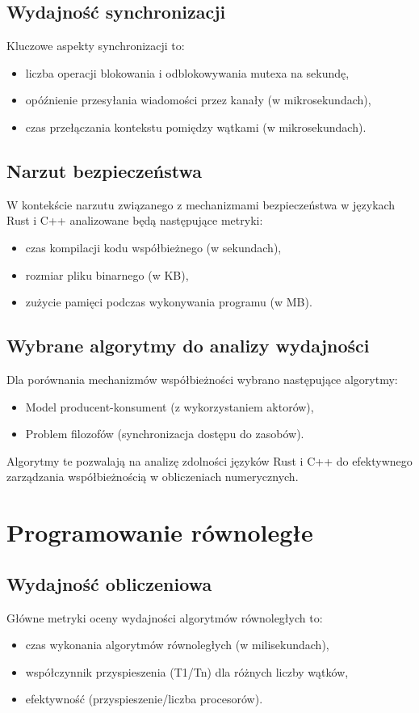 \subsection{Wydajność synchronizacji}
Kluczowe aspekty synchronizacji to:
\begin{itemize}
\item liczba operacji blokowania i odblokowywania mutexa na sekundę,
\item opóźnienie przesyłania wiadomości przez kanały (w mikrosekundach),
\item czas przełączania kontekstu pomiędzy wątkami (w mikrosekundach).
\end{itemize}

\subsection{Narzut bezpieczeństwa}
W kontekście narzutu związanego z mechanizmami bezpieczeństwa w językach Rust i C++ analizowane będą następujące metryki:
\begin{itemize}
\item czas kompilacji kodu współbieżnego (w sekundach),
\item rozmiar pliku binarnego (w KB),
\item zużycie pamięci podczas wykonywania programu (w MB).
\end{itemize}

\subsection{Wybrane algorytmy do analizy wydajności}
Dla porównania mechanizmów współbieżności wybrano następujące algorytmy:
\begin{itemize}
    \item Model producent-konsument (z wykorzystaniem aktorów),
    \item Problem filozofów (synchronizacja dostępu do zasobów).
\end{itemize}
Algorytmy te pozwalają na analizę zdolności języków Rust i C++ do efektywnego zarządzania współbieżnością w obliczeniach numerycznych.


\section{Programowanie równoległe}

\subsection{Wydajność obliczeniowa}
Główne metryki oceny wydajności algorytmów równoległych to:
\begin{itemize}
\item czas wykonania algorytmów równoległych (w milisekundach),
\item współczynnik przyspieszenia (T1/Tn) dla różnych liczby wątków,
\item efektywność (przyspieszenie/liczba procesorów).
\end{itemize}

